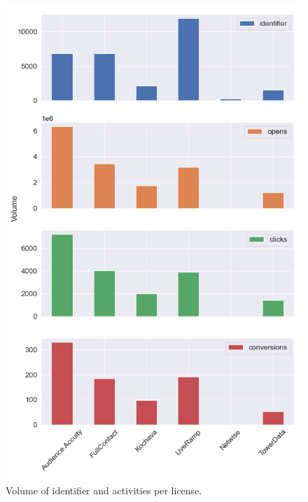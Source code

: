 \documentclass[11pt]{article} %
\begin{document}
\begin{figure}[h!]
  \includegraphics[width=0.8\linewidth]{../outputs/volume_per_license.png}
  \caption{Volume of identifier and activities per license.}
  \label{fig:volume_per_license}
\end{figure}
\end{document}
